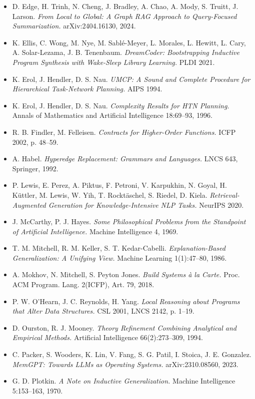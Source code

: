 \documentclass[11pt]{article}
\begin{document}
\begin{itemize}
\item D. Edge, H. Trinh, N. Cheng, J. Bradley, A. Chao, A. Mody, S. Truitt, J. Larson. \emph{From Local to Global: A Graph RAG Approach to Query-Focused Summarization.} arXiv:2404.16130, 2024.
\item K. Ellis, C. Wong, M. Nye, M. Sablé-Meyer, L. Morales, L. Hewitt, L. Cary, A. Solar-Lezama, J. B. Tenenbaum. \emph{DreamCoder: Bootstrapping Inductive Program Synthesis with Wake-Sleep Library Learning.} PLDI 2021.
\item K. Erol, J. Hendler, D. S. Nau. \emph{UMCP: A Sound and Complete Procedure for Hierarchical Task-Network Planning.} AIPS 1994.
\item K. Erol, J. Hendler, D. S. Nau. \emph{Complexity Results for HTN Planning.} Annals of Mathematics and Artificial Intelligence 18:69–93, 1996.
\item R. B. Findler, M. Felleisen. \emph{Contracts for Higher-Order Functions.} ICFP 2002, p. 48–59.
\item A. Habel. \emph{Hyperedge Replacement: Grammars and Languages.} LNCS 643, Springer, 1992.
\item P. Lewis, E. Perez, A. Piktus, F. Petroni, V. Karpukhin, N. Goyal, H. Küttler, M. Lewis, W. Yih, T. Rocktäschel, S. Riedel, D. Kiela. \emph{Retrieval-Augmented Generation for Knowledge-Intensive NLP Tasks.} NeurIPS 2020.
\item J. McCarthy, P. J. Hayes. \emph{Some Philosophical Problems from the Standpoint of Artificial Intelligence.} Machine Intelligence 4, 1969.
\item T. M. Mitchell, R. M. Keller, S. T. Kedar-Cabelli. \emph{Explanation-Based Generalization: A Unifying View.} Machine Learning 1(1):47–80, 1986.
\item A. Mokhov, N. Mitchell, S. Peyton Jones. \emph{Build Systems à la Carte.} Proc. ACM Program. Lang. 2(ICFP), Art. 79, 2018.
\item P. W. O'Hearn, J. C. Reynolds, H. Yang. \emph{Local Reasoning about Programs that Alter Data Structures.} CSL 2001, LNCS 2142, p. 1–19.
\item D. Ourston, R. J. Mooney. \emph{Theory Refinement Combining Analytical and Empirical Methods.} Artificial Intelligence 66(2):273–309, 1994.
\item C. Packer, S. Wooders, K. Lin, V. Fang, S. G. Patil, I. Stoica, J. E. Gonzalez. \emph{MemGPT: Towards LLMs as Operating Systems.} arXiv:2310.08560, 2023.
\item G. D. Plotkin. \emph{A Note on Inductive Generalization.} Machine Intelligence 5:153–163, 1970.

\end{itemize}
\end{document}

